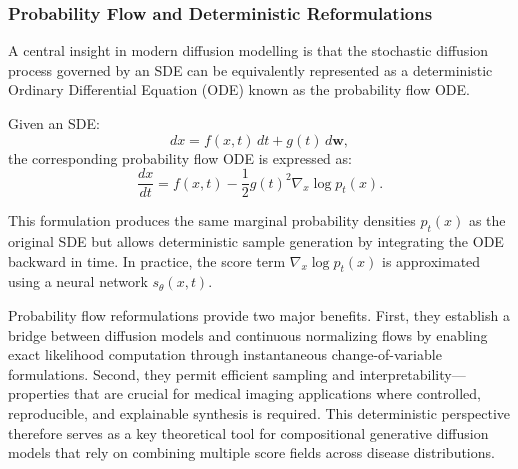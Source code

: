 \subsubsection{Probability Flow and Deterministic Reformulations}

A central insight in modern diffusion modelling is that the stochastic diffusion process governed by an SDE can be equivalently represented as a deterministic Ordinary Differential Equation (ODE) known as the probability flow ODE.  

Given an SDE:
\begin{equation}
    dx = f(x, t)\,dt + g(t)\,d\mathbf{w},
\end{equation}
the corresponding probability flow ODE is expressed as:
\begin{equation}
    \frac{dx}{dt} = f(x, t) - \frac{1}{2} g(t)^2 \nabla_x \log p_t(x).
\end{equation}

This formulation produces the same marginal probability densities \( p_t(x) \) as the original SDE but allows deterministic sample generation by integrating the ODE backward in time. In practice, the score term \( \nabla_x \log p_t(x) \) is approximated using a neural network \( s_\theta(x, t) \).  

Probability flow reformulations provide two major benefits. First, they establish a bridge between diffusion models and continuous normalizing flows by enabling exact likelihood computation through instantaneous change-of-variable formulations. Second, they permit efficient sampling and interpretability—properties that are crucial for medical imaging applications where controlled, reproducible, and explainable synthesis is required. This deterministic perspective therefore serves as a key theoretical tool for compositional generative diffusion models that rely on combining multiple score fields across disease distributions.
